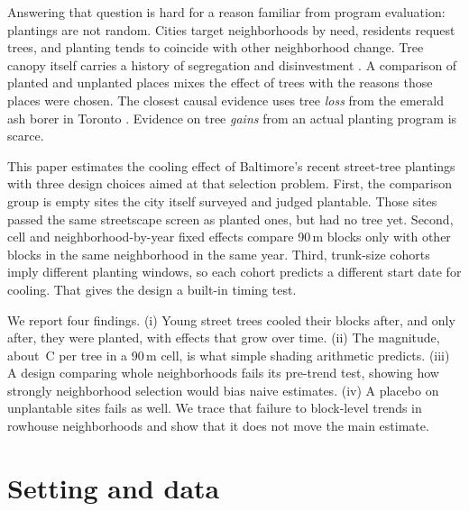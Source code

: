 \documentclass[11pt]{article}
\newcommand{\degC}{\,\textdegree C}
\begin{document}
Answering that question is hard for a reason familiar from program evaluation: plantings are not random. Cities target neighborhoods by need, residents request trees, and planting tends to coincide with other neighborhood change. Tree canopy itself carries a history of segregation and disinvestment \citep{locke2021,hoffman2020}. A comparison of planted and unplanted places mixes the effect of trees with the reasons those places were chosen. The closest causal evidence uses tree \emph{loss} from the emerald ash borer in Toronto \citep{han2024}. Evidence on tree \emph{gains} from an actual planting program is scarce.

This paper estimates the cooling effect of Baltimore's recent street-tree plantings with three design choices aimed at that selection problem. First, the comparison group is empty sites the city itself surveyed and judged plantable. Those sites passed the same streetscape screen as planted ones, but had no tree yet. Second, cell and neighborhood-by-year fixed effects compare 90\,m blocks only with other blocks in the same neighborhood in the same year. Third, trunk-size cohorts imply different planting windows, so each cohort predicts a different start date for cooling. That gives the design a built-in timing test.

We report four findings. (i) Young street trees cooled their blocks after, and only after, they were planted, with effects that grow over time. (ii) The magnitude, about \EstAabs\degC{} per tree in a 90\,m cell, is what simple shading arithmetic predicts. (iii) A design comparing whole neighborhoods fails its pre-trend test, showing how strongly neighborhood selection would bias naive estimates. (iv) A placebo on unplantable sites fails as well. We trace that failure to block-level trends in rowhouse neighborhoods and show that it does not move the main estimate.

\section{Setting and data}
\end{document}
